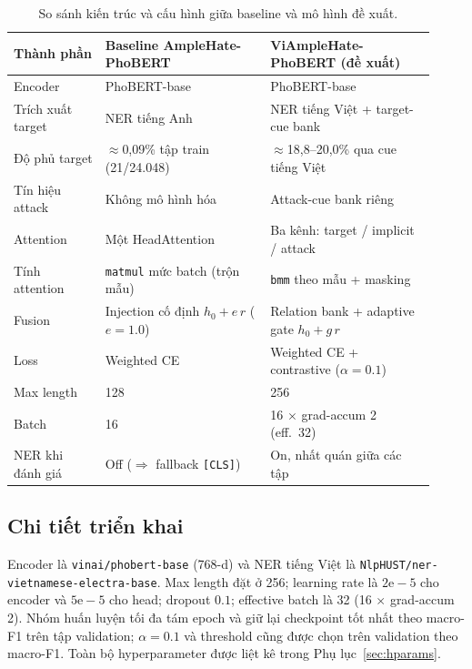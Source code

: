 \documentclass[11pt]{article}
\begin{document}
\begin{table}[tp]
  \centering
  \small
  \begin{tabular}{p{0.20\linewidth} p{0.36\linewidth} p{0.36\linewidth}}
    \toprule
    \textbf{Thành phần} & \textbf{Baseline AmpleHate-PhoBERT} & \textbf{ViAmpleHate-PhoBERT (đề xuất)} \\
    \midrule
    Encoder & PhoBERT-base & PhoBERT-base \\
    Trích xuất target & NER tiếng Anh & NER tiếng Việt + target-cue bank \\
    Độ phủ target & $\approx$0,09\% tập train (21/24{.}048) & $\approx$18,8--20,0\% qua cue tiếng Việt \\
    Tín hiệu attack & Không mô hình hóa & Attack-cue bank riêng \\
    Attention & Một HeadAttention & Ba kênh: target / implicit / attack \\
    Tính attention & \texttt{matmul} mức batch (trộn mẫu) & \texttt{bmm} theo mẫu + masking \\
    Fusion & Injection cố định $h_0+e\,r$ ($e{=}1.0$) & Relation bank + adaptive gate $h_0+g\,r$ \\
    Loss & Weighted CE & Weighted CE + contrastive ($\alpha{=}0.1$) \\
    Max length & 128 & 256 \\
    Batch & 16 & 16 $\times$ grad-accum 2 (eff.\ 32) \\
    NER khi đánh giá & Off ($\Rightarrow$ fallback \texttt{[CLS]}) & On, nhất quán giữa các tập \\
    \bottomrule
  \end{tabular}
  \caption{So sánh kiến trúc và cấu hình giữa baseline và mô hình đề xuất.}
  \label{tab:arch}
\end{table}

\subsection{Chi tiết triển khai}
Encoder là \texttt{vinai/phobert-base} (768-d) và NER tiếng Việt là \texttt{NlpHUST/ner-vietnamese-electra-base}. Max length đặt ở 256; learning rate là $2\mathrm{e}{-}5$ cho encoder và $5\mathrm{e}{-}5$ cho head; dropout $0.1$; effective batch là 32 (16 $\times$ grad-accum 2). Nhóm huấn luyện tối đa tám epoch và giữ lại checkpoint tốt nhất theo macro-F1 trên tập validation; $\alpha=0.1$ và threshold cũng được chọn trên validation theo macro-F1. Toàn bộ hyperparameter được liệt kê trong Phụ lục~\ref{sec:hparams}.
\end{document}
